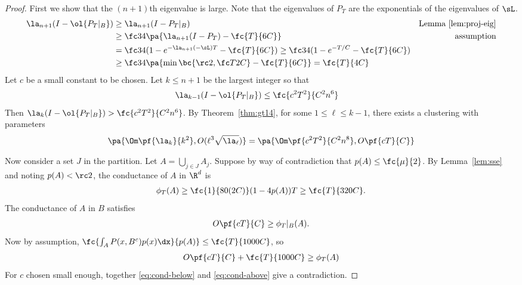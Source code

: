 \begin{proof}
First we show that the $(n+1)$th eigenvalue is large. Note that the eigenvalues of $P_T$ are the exponentials of the eigenvalues of $\sL$.
\begin{align}
\la_{n+1}(I-\ol{P_T|_B}) 
& \ge \la_{n+1}(I - P_T|_B)&\text{Lemma~\ref{lem:proj-eig}}\\
&\ge \fc34\pa{ \la_{n+1}(I-P_T)-\fc{T}{6C}} & \text{assumption}\\
&= \fc34(1-e^{-\la_{n+1}(-\sL)T}-\fc{T}{6C})
\ge \fc34(1-e^{-T/C} - \fc{T}{6C})\\
&\ge \fc34\pa{ \min\bc{\rc 2 , \fc T{2C}} - \fc{T}{6C}} = \fc{T}{4C}
\end{align}
Let $c$ be a small constant to be chosen.
Let $k\le n+1$ be the largest integer so that 
\begin{align}
\la_{k-1}(I-\ol{P_T|_B}) &\le \fc{c^2 T^2}{C^2n^6}
\end{align}
Then
$\la_k(I-\ol{P_T|_B}) >\fc{c^2 T^2}{C^2n^6}$.
By Theorem~\ref{thm:gt14}, for some $1\le \ell \le k-1$, there exists a clustering with parameters 
\begin{align}
\pa{
\Om\pf{\la_k}{k^2}, O(\ell^3\sqrt{\la_{\ell}})
} = 
\pa{\Om\pf{c^2 T^2}{C^2n^8}
,
O\pf{cT}{C}
}
\end{align}

Now consider a set $J$ in the partition. 
Let $A=\bigcup_{j\in J} A_j$.
Suppose by way of contradiction that $p(A)\le \fc{\mu}{2}$.
By Lemma~\ref{lem:sse} and noting $p(A)<\rc 2$, the conductance of $A$ in $\R^d$ is
\begin{align}\label{eq:cond-below}
\phi_T(A)
\ge 
\fc{1}{80(2C)}(1-4p(A))T
\ge 
\fc{T}{320C}.
\end{align}
The conductance of $A$ in $B$ satisfies
\begin{align}
O\pf{cT}{C} \ge \phi_T|_{B}(A).
\end{align}
Now by assumption, $\fc{\int_A P(x,B^c)p(x)\dx}{p(A)}\le \fc{T}{1000C}$, so
\begin{align}\label{eq:cond-above}
O\pf{cT}{C} + \fc{T}{1000C}\ge \phi_T(A)
\end{align}
For $c$ chosen small enough, together \eqref{eq:cond-below} and \eqref{eq:cond-above} give a contradiction.
\end{proof}

